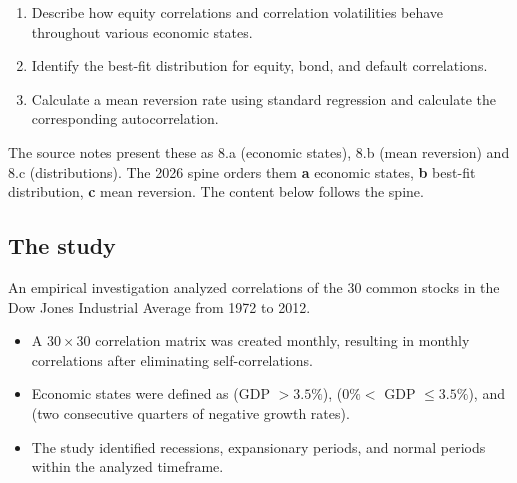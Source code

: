 
\begin{mrkeybox}[title={Learning objectives in this reading}]
\small
\begin{enumerate}[label=\textbf{\alph*.},leftmargin=1.7em]
\item Describe how equity correlations and correlation volatilities behave throughout various
      economic states.
\item Identify the best-fit distribution for equity, bond, and default correlations.
\item Calculate a mean reversion rate using standard regression and calculate the corresponding
      autocorrelation.
\end{enumerate}
\end{mrkeybox}

\begin{mrtrapbox}[title={Note on ordering}]
The source notes present these as 8.a (economic states), 8.b (mean reversion) and 8.c
(distributions). The 2026 spine orders them \textbf{a} economic states, \textbf{b} best-fit
distribution, \textbf{c} mean reversion. The content below follows the spine.
\end{mrtrapbox}


\subsection{The study}
An empirical investigation analyzed correlations of the 30 common stocks in the Dow Jones
Industrial Average from 1972 to 2012.

\begin{itemize}
\item A $30 \times 30$ correlation matrix was created monthly, resulting in 
      monthly correlations after eliminating self-correlations.
\item Economic states were defined as  (GDP $> 3.5\%$), 
      ($0\% <$ GDP $\le 3.5\%$), and  (two consecutive quarters of negative
      growth rates).
\item The study identified  recessions,  expansionary periods, and
       normal periods within the analyzed timeframe.
\end{itemize}

